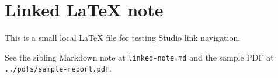 \section{Linked LaTeX note}

This is a small local \LaTeX{} file for testing Studio link navigation.

See the sibling Markdown note at \texttt{linked-note.md} and the sample PDF at
\texttt{../pdfs/sample-report.pdf}.
